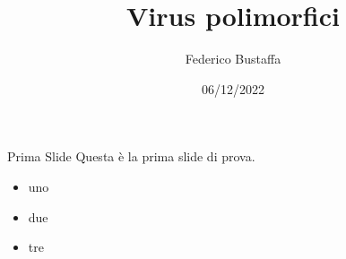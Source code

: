 \documentclass{beamer}
\title{Virus polimorfici}
\author{Federico Bustaffa}
\date{06/12/2022}
\begin{document}
\maketitle

\begin{frame}{Prima Slide}
	Questa è la prima slide di prova.
	\begin{itemize}
		\item uno
		\item due
		\item tre
	\end{itemize}
\end{frame}
\end{document}

